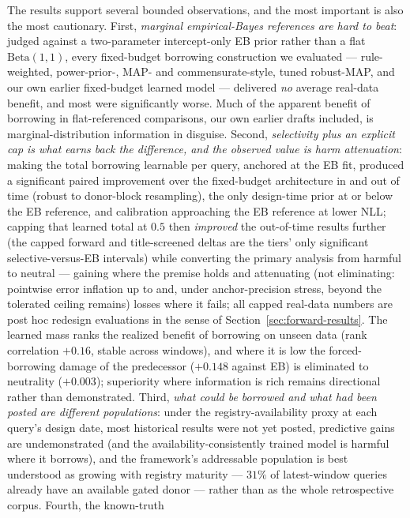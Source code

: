 \documentclass[11pt]{article}
\begin{document}
The results support several bounded observations, and the most important is
also the most cautionary. First, \emph{marginal empirical-Bayes references are
hard to beat}: judged against a two-parameter intercept-only EB prior rather
than a flat $\mathrm{Beta}(1,1)$, every fixed-budget borrowing construction we
evaluated --- rule-weighted, power-prior-, MAP- and commensurate-style, tuned
robust-MAP, and our own earlier fixed-budget learned model --- delivered
\emph{no} average real-data benefit, and most were significantly worse. Much
of the apparent benefit of borrowing in flat-referenced comparisons, our own
earlier drafts included, is marginal-distribution information in disguise.
Second, \emph{selectivity plus an explicit cap is what earns back the
difference, and the observed value is harm attenuation}: making
the total borrowing learnable per query, anchored at the EB fit, produced a
significant paired improvement over the fixed-budget architecture in and out
of time (robust to donor-block resampling), the only design-time prior at or
below the EB reference, and calibration
approaching the EB reference at lower NLL; capping that learned total at
$0.5$ then \emph{improved} the out-of-time results further (the capped
forward and title-screened deltas are the tiers' only significant
selective-versus-EB intervals) while converting the primary analysis from
harmful to neutral --- gaining where
the premise holds and attenuating (not eliminating: pointwise error
inflation up to and, under anchor-precision stress, beyond the tolerated
ceiling remains) losses where it fails; all capped real-data numbers are
post hoc redesign evaluations in the sense of
Section~\ref{sec:forward-results}. The learned
mass ranks
the realized benefit of borrowing on unseen data (rank correlation $+0.16$,
stable across windows), and where it is low the forced-borrowing damage of
the predecessor ($+0.148$ against EB) is eliminated to neutrality
($+0.003$); superiority where information is rich remains directional rather
than demonstrated. Third, \emph{what could be borrowed and what had been
posted are different populations}: under the registry-availability proxy at
each query's design date, most historical results were not yet
posted, predictive gains are undemonstrated (and the
availability-consistently trained model is harmful where it borrows), and
the framework's
addressable population is best understood as growing with registry maturity
--- $31\%$ of latest-window queries already have an available gated donor ---
rather than as the whole retrospective corpus. Fourth, the known-truth
\end{document}
